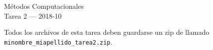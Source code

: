 \documentclass[11pt,letterpaper]{exam}
\begin{document}
\begin{center}
{\Large Métodos Computacionales} \\
Tarea 2 --- 2018-10\\

\end{center}




Todos los archivos de esta tarea deben guardarse un zip de llamado \verb"minombre_miapellido_tarea2.zip".
\end{document}
